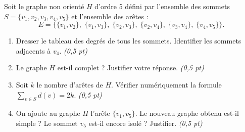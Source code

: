 \documentclass[11pt]{article}
\begin{document}
\begin{exercice}
Soit le graphe non orienté $H$ d'ordre 5 défini par l'ensemble des sommets $S = \{v_1, v_2, v_3, v_4, v_5\}$ et l'ensemble des arêtes :
\[
E = \{\{v_1,v_2\},\; \{v_1,v_3\},\; \{v_2,v_3\},\; \{v_2,v_4\},\; \{v_3,v_4\},\; \{v_4,v_5\}\}.
\]
\begin{enumerate}
    \item Dresser le tableau des degrés de tous les sommets. Identifier les sommets adjacents à $v_4$. \textit{(0,5 pt)}
    \item Le graphe $H$ est-il complet ? Justifier votre réponse. \textit{(0,5 pt)}
    \item Soit $k$ le nombre d'arêtes de $H$. Vérifier numériquement la formule $\sum_{v \in S} d(v) = 2k$. \textit{(0,5 pt)}
    \item On ajoute au graphe $H$ l'arête $\{v_1, v_5\}$. Le nouveau graphe obtenu est-il simple ? Le sommet $v_5$ est-il encore isolé ? Justifier. \textit{(0,5 pt)}
\end{enumerate}
\end{exercice}
\end{document}
